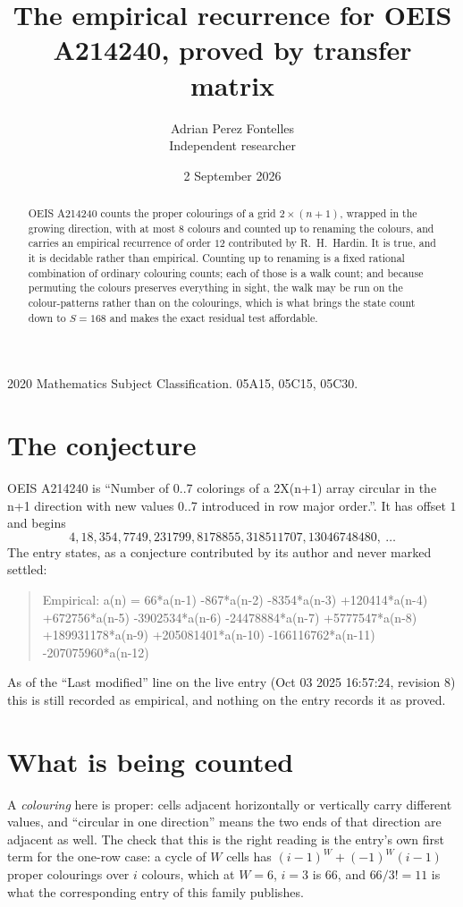 \documentclass[11pt,a4paper]{article}
\title{The empirical recurrence for OEIS A214240, proved by transfer matrix}
\author{Adrian Perez Fontelles\\ \small Independent researcher}
\date{2 September 2026}
\theoremstyle{plain}
\theoremstyle{definition}
\begin{document}
\maketitle

\begin{abstract}
OEIS A214240 counts the proper colourings of a grid $2\times(n+1)$, wrapped in the growing direction, with at most $8$ colours and
counted up to renaming the colours, and carries an empirical recurrence of order $12$
contributed by R.~H.~Hardin. It is true, and it is decidable rather than empirical. Counting
up to renaming is a fixed rational combination of ordinary colouring counts; each of those is
a walk count; and because permuting the colours preserves everything in sight, the walk may be
run on the colour-patterns rather than on the colourings, which is what brings the state count
down to $S=168$ and makes the exact residual test affordable.
\end{abstract}

\noindent\small 2020 Mathematics Subject Classification. 05A15, 05C15, 05C30.\normalsize

\section{The conjecture}

OEIS A214240 is ``Number of 0..7 colorings of a 2X(n+1) array circular in the n+1 direction with new values 0..7 introduced in row major order.''. It has offset $1$ and begins
\[
4, 18, 354, 7749, 231799, 8178855, 318511707, 13046748480,\ \dots
\]
The entry states, as a conjecture contributed by its author and never marked settled:
\begin{quote}
Empirical: a(n) = 66*a(n-1) -867*a(n-2) -8354*a(n-3) +120414*a(n-4) +672756*a(n-5) -3902534*a(n-6) -24478884*a(n-7) +5777547*a(n-8) +189931178*a(n-9) +205081401*a(n-10) -166116762*a(n-11) -207075960*a(n-12)
\end{quote}
As of the ``Last modified'' line on the live entry (Oct 03 2025 16:57:24, revision 8) this is still
recorded as empirical, and nothing on the entry records it as proved.

\section{What is being counted}

A \emph{colouring} here is proper: cells adjacent horizontally or vertically carry different
values, and ``circular in one direction'' means the two ends of that direction are adjacent as
well. The check that this is the right reading is the entry's own first term for the
one-row case: a cycle of $W$ cells has $(i-1)^W+(-1)^W(i-1)$ proper colourings over $i$
colours, which at $W=6$, $i=3$ is $66$, and $66/3!=11$ is what the corresponding entry of this
family publishes.
\end{document}
